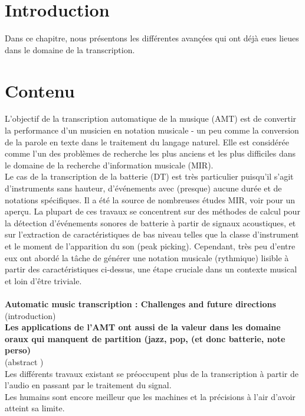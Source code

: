 \section{Introduction}

Dans ce chapitre, nous présentons les différentes avançées qui ont déjà eues lieues dans le domaine de la transcription.

\section{Contenu}
L'objectif de la transcription automatique de la musique (AMT) \cite{article1} est de convertir la performance d'un musicien en notation musicale - un peu comme la conversion de la parole en texte dans le traitement du langage naturel. Elle est considérée comme l'un des problèmes de recherche les plus anciens et les plus difficiles dans le domaine de la recherche d'information musicale (MIR).\\
Le cas de la transcription de la batterie (DT) est très particulier puisqu'il s'agit d'instruments sans hauteur, d'événements avec (presque) aucune durée et de notations spécifiques. Il a été la source de nombreuses études MIR, voir \cite{8350302} pour un aperçu. La plupart de ces travaux se concentrent sur des méthodes de calcul pour la détection d'événements sonores de batterie à partir de signaux acoustiques, et sur l'extraction de caractéristiques de bas niveau telles que la classe d'instrument et le moment de l'apparition du son (peak picking). Cependant, très peu d'entre eux ont abordé la tâche de générer une notation musicale (rythmique) lisible à partir des caractéristiques ci-dessus, une étape cruciale dans un contexte musical et loin d'être triviale.\\\\
\textbf{Automatic music transcription : Challenges and future directions} \cite{article1}\\
(introduction\cite{article1})\\
\textbf{Les applications de l’AMT ont aussi de la valeur dans les domaine oraux qui manquent de partition (jazz, pop, (et donc batterie, note perso)}\\
(abstract \cite{article1})\\
Les différents travaux existant se préoccupent plus de la transcription à partir de l’audio en passant par le traitement du signal.\\
Les humains sont encore meilleur que les machines et la précisions à l’air d’avoir atteint sa limite.\\
